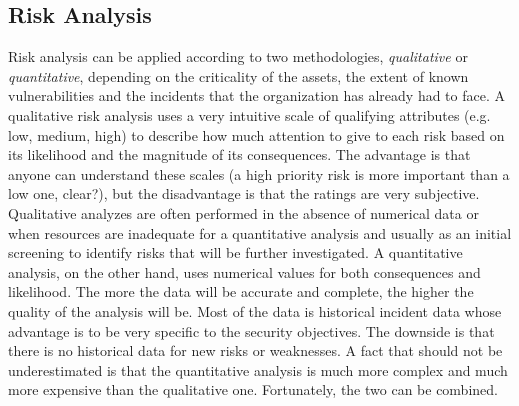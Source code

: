 \subsection{Risk Analysis}
Risk analysis can be applied according to two methodologies, \textit{qualitative} or \textit{quantitative}, depending on the criticality of the assets, the extent of known vulnerabilities and the incidents that the organization has already had to face.
A qualitative risk analysis uses a very intuitive scale of qualifying attributes (e.g. low, medium, high) to describe how much attention to give to each risk based on its likelihood and the magnitude of its consequences. The advantage is that anyone can understand these scales (a high priority risk is more important than a low one, clear?), but the disadvantage is that the ratings are very subjective. Qualitative analyzes are often performed in the absence of numerical data or when resources are inadequate for a quantitative analysis and usually as an initial screening to identify risks that will be further investigated. A quantitative analysis, on the other hand, uses numerical values for both consequences and likelihood. The more the data will be accurate and complete, the higher the quality of the analysis will be. Most of the data is historical incident data whose advantage is to be very specific to the security objectives. The downside is that there is no historical data for new risks or weaknesses. A fact that should not be underestimated is that the quantitative analysis is much more complex and much more expensive than the qualitative one. Fortunately, the two can be combined.
